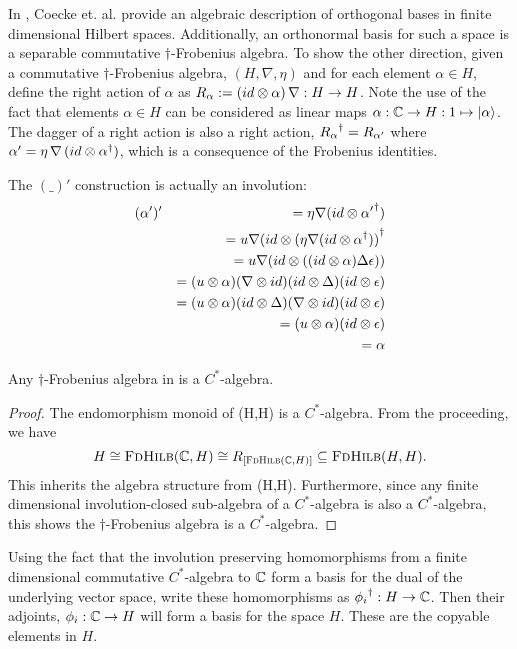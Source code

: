 In \cite{coeckeetal08:ortho}, Coecke et. al. provide an algebraic description of orthogonal bases in
finite dimensional Hilbert spaces. Additionally, an orthonormal basis for such a space is
a separable commutative $\dagger$-Frobenius algebra. To show the other direction, given a commutative
$\dagger$-Frobenius algebra, $(H,\nabla,\eta)$ and for each element $\alpha\in H$, define the right
action of $\alpha$ as $R_{\alpha}:=(id\otimes\alpha)\, \nabla:H\to H$. Note the use of the fact that
elements $\alpha\in H$ can be considered as linear maps $\alpha:\mathbb{C} \to H:1\mapsto \left\vert{\alpha}\right\rangle$.
The dagger of a right action is also a right action, ${R_{\alpha}}^{\dagger} = R_{\alpha'}$ where
$\alpha'= \eta\, \nabla\, (id\otimes {\alpha}^{\dagger})$, which is a consequence of the Frobenius identities.

The $(\_)'$ construction is actually an involution:
\begin{eqnarray*}
  &(\alpha')' &= \eta \nabla (id \otimes {\alpha'}^{\dagger}) \\
  && = u \nabla (id \otimes {(\eta \nabla (id \otimes \ensuremath{{\alpha}^{\dagger}}))}^{\dagger}\\
  && = u \nabla (id \otimes ( (id \otimes \alpha) \Delta \epsilon))\\
  && = (u \otimes \alpha) (\nabla \otimes id) (id \otimes \Delta) (id \otimes  \epsilon)\\
  && = (u \otimes \alpha) (id \otimes \Delta) (\nabla \otimes id) (id \otimes  \epsilon)\\
  && = (u \otimes \alpha)  (id \otimes  \epsilon)\\
  && = \alpha
\end{eqnarray*}

\begin{lemma}\label{lemma:cstaralgebra}
  Any $\dagger$-Frobenius algebra in \fdh is a $C^{*}$-algebra.
\end{lemma}
\begin{proof}
  The endomorphism monoid of \fdh(H,H) is a $C^{*}$-algebra. From the proceeding, we have
  \[
    H \cong \textsc{FdHilb}(\mathbb{C},H) \cong R_{[\textsc{FdHilb}(\mathbb{C},H)]}\subseteq\textsc{FdHilb}(H,H).
  \]
  This inherits the algebra structure from \fdh(H,H). Furthermore, since any finite dimensional
  involution-closed sub-algebra of a $C^{*}$-algebra is also a $C^{*}$-algebra, this shows the
  $\dagger$-Frobenius algebra is a $C^{*}$-algebra.
\end{proof}

Using the fact that the involution preserving homomorphisms from a finite dimensional commutative
$C^{*}$-algebra to $\mathbb{C}$ form a basis for the dual of the underlying vector space, write these
homomorphisms as ${\phi_{i}}^{\dagger}:H \to \mathbb{C}$. Then their adjoints, $\phi_{i}:\mathbb{C}\to H$ will form a
basis for the space $H$. These are the copyable elements in $H$.


